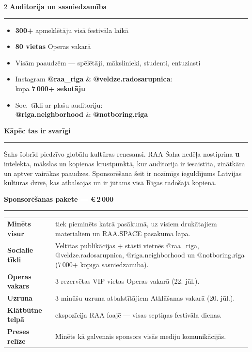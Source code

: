 \documentclass[a4paper,10pt]{article}
\newcommand{\sectionrule}[1]{%
  \vspace{5pt}%
  {\color{raared}\bfseries\large #1}\\[-3pt]%
  {\color{raared}\rule{\linewidth}{0.8pt}}%
  \vspace{3pt}%
}
\begin{document}
\begin{center}
\begin{minipage}{0.87\paperwidth}
\begin{multicols}{2}
\sectionrule{Auditorija un sasniedzamība}

{\small
\begin{itemize}[leftmargin=*,itemsep=1.5pt,topsep=0pt]
  \item \textbf{300+} apmeklētāju visā festivāla laikā
  \item \textbf{80 vietas} Operas vakarā
  \item Visām paaudzēm — spēlētāji, mākslinieki, studenti, entuziasti
  \item Instagram \textbf{@raa\_riga} \& \textbf{@veldze.radosarupnica}:\\
        kopā \textbf{7\,000+ sekotāju}
  \item Soc.\ tīkli ar plašu auditoriju:\\
        \textbf{@riga.neighborhood} \& \textbf{@notboring.riga}
\end{itemize}
}

\vspace{0.25cm}
\sectionrule{Kāpēc tas ir svarīgi}

{\small Šahs šobrīd piedzīvo globālu kultūras renesansi. RAA Šaha nedēļa nostiprina \textbf{\sponsor u} intelekta, mākslas un kopienas krustpunktā, kur auditorija ir iesaistīta, zinātkāra un aptver vairākas paaudzes. Sponsorēšana šeit ir nozīmīgs ieguldījums Latvijas kultūras dzīvē, kas atbalsojas un ir jūtams visā Rīgas radošajā kopienā.}

\end{multicols}

\vspace{0.12cm}

\sectionrule{Sponsorēšanas pakete — €\,2\,000}

{\small
\begin{tabularx}{\linewidth}{@{} >{\bfseries}p{3.5cm} X @{}}
Minēts visur         & \sponsor{} tiek pieminēts katrā pasākumā, uz visiem drukātajiem materiāliem un RAA.SPACE pasākuma lapā. \\[2pt]
Sociālie tīkli       & Veltītas publikācijas + stāsti vietnēs @raa\_riga, @veldze.radosarupnica, @riga.neighborhood un @notboring.riga (7\,000+ kopīgā sasniedzamība). \\[2pt]
Operas vakars        & 3 rezervētas VIP vietas Operas vakarā (22. jūl.). \\[2pt]
Uzruna               & 3 minūšu uzruna atbalstītājiem Atklāšanas vakarā (20. jūl.). \\[2pt]
Klātbūtne telpā      & \sponsor{} ekspozīcija RAA foajē — visas septiņas festivāla dienas. \\[2pt]
Preses relīze        & Minēts kā galvenais sponsors visās mediju komunikācijās. \\
\end{tabularx}
}


\end{minipage}
\end{center}
\end{document}
